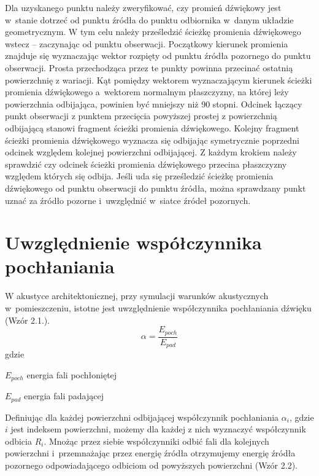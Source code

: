 Dla uzyskanego punktu należy zweryfikować, czy promień dźwiękowy jest w~stanie dotrzeć od punktu źródła do punktu odbiornika w~danym układzie geometrycznym. W tym celu należy prześledzić ścieżkę promienia dźwiękowego wstecz – zaczynając od punktu obserwacji. Początkowy kierunek promienia znajduje się wyznaczając wektor rozpięty od punktu źródła pozornego do punktu obserwacji. Prosta przechodząca przez te punkty powinna przecinać ostatnią powierzchnię z wariacji. Kąt pomiędzy wektorem wyznaczającym kierunek ścieżki promienia dźwiękowego a~wektorem normalnym płaszczyzny, na której leży powierzchnia odbijająca, powinien być mniejszy niż 90 stopni. Odcinek łączący punkt obserwacji z punktem przecięcia powyższej prostej z powierzchnią odbijającą stanowi fragment ścieżki promienia dźwiękowego. Kolejny fragment ścieżki promienia dźwiękowego wyznacza się odbijając symetrycznie poprzedni odcinek względem kolejnej powierzchni odbijającej. Z każdym krokiem należy sprawdzić czy odcinek ścieżki promienia dźwiękowego przecina płaszczyzny względem których się odbija. Jeśli uda się prześledzić ścieżkę promienia dźwiękowego od punktu obserwacji do punktu źródła, można sprawdzany punkt uznać za źródło pozorne i~uwzględnić w~siatce źródeł pozornych.


\section{Uwzględnienie współczynnika pochłaniania}\label{sec:zm}

W akustyce architektonicznej, przy symulacji warunków akustycznych w~pomieszczeniu, istotne jest uwzględnienie współczynnika pochłaniania dźwięku (Wzór 2.1.). \\

\begin{equation}
\alpha=\frac{E_{poch}}{E_{pad}}
\end{equation}
gdzie
\begin{eqwhere}[2cm]
        \item[$E_{poch}$] energia fali pochłoniętej
        \item[$E_{pad}$] energia fali padającej
\end{eqwhere}

Definiując dla każdej powierzchni odbijającej współczynnik pochłaniania $\alpha_i$, gdzie $i$  jest indeksem powierzchni, możemy dla każdej z nich wyznaczyć współczynnik odbicia $R_i$. Mnożąc przez siebie współczynniki odbić fali dla kolejnych powierzchni i~przemnażając przez energię źródła otrzymujemy energię źródła pozornego odpowiadającego odbiciom od powyższych powierzchni (Wzór 2.2). \\

